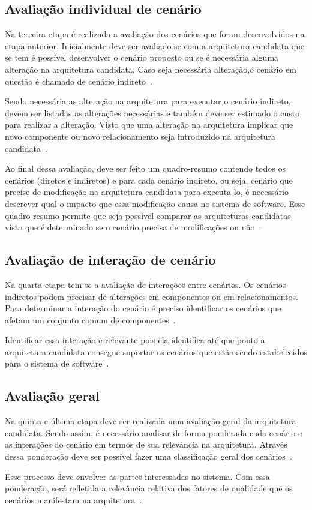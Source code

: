 \subsection{Avaliação individual de cenário}

Na terceira etapa é realizada a avaliação dos cenários que foram desenvolvidos na etapa anterior. Inicialmente deve ser avaliado se com a arquitetura candidata que se tem é possível desenvolver o cenário proposto ou se é necessária alguma alteração na arquitetura candidata. Caso seja necessária alteração,o cenário em questão é chamado de cenário indireto~\cite{scenario_methods}.

Sendo necessária as alteração na arquitetura para executar o cenário indireto, devem ser listadas as alterações necessárias e também deve ser estimado o custo para realizar a alteração. Visto que uma alteração na arquitetura implicar que  novo componente ou novo relacionamento seja introduzido na arquitetura candidata~\cite{scenario_methods}.

Ao final dessa avaliação, deve ser feito um quadro-resumo contendo todos os cenários (diretos e indiretos) e para cada cenário indireto, ou seja, cenário que precise de modificação na arquitetura candidata para executa-lo, é necessário descrever qual o impacto que essa modificação causa no sistema de software. Esse quadro-resumo permite que seja possível comparar as arquiteturas candidatas visto que é determinado se o cenário precisa de modificações ou não~\cite{scenario_methods}.

\subsection{Avaliação de interação de cenário}

Na quarta etapa tem-se a avaliação de interações entre cenários. Os cenários indiretos podem precisar de alterações em componentes ou em relacionamentos. Para determinar a interação do cenário é preciso identificar os cenários que afetam um conjunto comum de componentes~\cite{scenario_methods}. 

Identificar essa interação é relevante pois ela identifica até que ponto a arquitetura candidata consegue suportar os cenários que estão sendo estabelecidos para o sistema de software~\cite{scenario_methods}.

\subsection{Avaliação geral}

Na quinta e última etapa deve ser realizada uma avaliação geral da arquitetura candidata. Sendo assim, é necessário analisar de forma ponderada cada cenário e as interações do cenário em termos de sua relevância na arquitetura. Através dessa ponderação deve ser possível fazer uma classificação geral dos cenários~\cite{scenario_methods}.

Esse processo deve envolver as partes interessadas no sistema. Com essa ponderação, será refletida a relevância relativa dos fatores de qualidade que os cenários manifestam na arquitetura~\cite{scenario_methods}.
